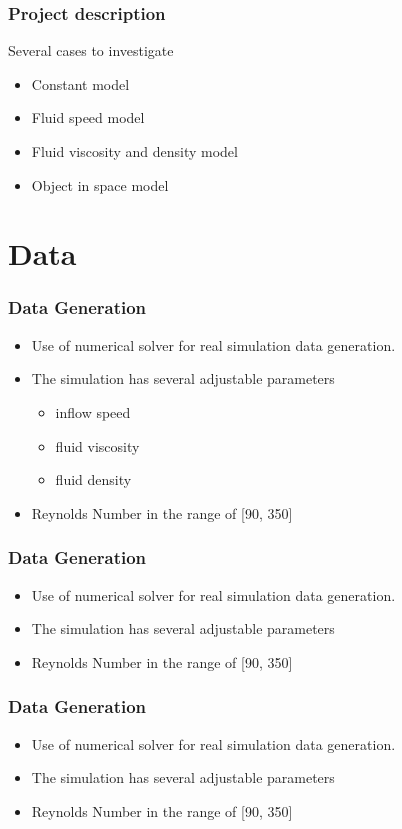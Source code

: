 \documentclass[18pt]{beamer}
\begin{document}
\begin{frame}[t]
  \frametitle{Project description}
  \large{Several cases to investigate}
  \begin{itemize}
  \item Constant model
  \item Fluid speed model
  \item Fluid viscosity and density model
  \item Object in space model
  \end{itemize}
  
  
  
\end{frame}

\section{Data}
\begin{frame}[t]
  \frametitle{Data Generation}
  \begin{itemize}
  \item Use of numerical solver for real simulation data generation.
  \item The simulation has several adjustable parameters
    \begin{itemize}
    \item inflow speed
    \item fluid viscosity
    \item fluid density
    \end{itemize}
  \item Reynolds Number in the range of [90, 350]
  \end{itemize}  
\end{frame}

\begin{frame}[t]
  \frametitle{Data Generation}
  \begin{itemize}
  \item Use of numerical solver for real simulation data generation.
  \item The simulation has several adjustable parameters
  \item Reynolds Number in the range of [90, 350]
  \end{itemize}
\end{frame}


\begin{frame}[t]
  \frametitle{Data Generation}
  \begin{itemize}
  \item Use of numerical solver for real simulation data generation.
  \item The simulation has several adjustable parameters
  \item Reynolds Number in the range of [90, 350]
  \end{itemize}

\end{frame}
\end{document}
